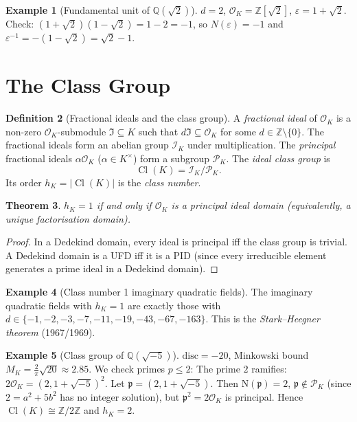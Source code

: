 \documentclass[12pt,a4paper]{amsart}
\newtheorem{theorem}{Theorem}[section]
\theoremstyle{definition}
\newtheorem{definition}[theorem]{Definition}
\newtheorem{example}[theorem]{Example}
\newcommand{\Z}{\mathbb{Z}}
\newcommand{\Q}{\mathbb{Q}}
\newcommand{\OK}{\mathcal{O}_K}
\newcommand{\p}{\mathfrak{p}}
\newcommand{\Nm}{\mathrm{N}}
\newcommand{\disc}{\mathrm{disc}}
\DeclareMathOperator{\Cl}{Cl}
\begin{document}
\begin{example}[Fundamental unit of $\Q(\sqrt{2})$]
$d=2$, $\OK = \Z[\sqrt{2}]$, $\varepsilon = 1 + \sqrt{2}$.
Check: $(1+\sqrt{2})(1-\sqrt{2}) = 1 - 2 = -1$, so $N(\varepsilon) = -1$
and $\varepsilon^{-1} = -(1-\sqrt{2}) = \sqrt{2}-1$.
\end{example}

\section{The Class Group}

\begin{definition}[Fractional ideals and the class group]
A \emph{fractional ideal} of $\OK$ is a non-zero $\OK$-submodule
$\mathfrak{I} \subseteq K$ such that $d\mathfrak{I} \subseteq \OK$
for some $d \in \Z \setminus \{0\}$.  The fractional ideals form an
abelian group $\mathcal{I}_K$ under multiplication.  The \emph{principal}
fractional ideals $\alpha\OK$ ($\alpha \in K^\times$) form a subgroup
$\mathcal{P}_K$.  The \emph{ideal class group} is
\[
  \Cl(K) = \mathcal{I}_K / \mathcal{P}_K.
\]
Its order $h_K = |\Cl(K)|$ is the \emph{class number}.
\end{definition}

\begin{theorem}
$h_K = 1$ if and only if $\OK$ is a principal ideal domain (equivalently,
a unique factorisation domain).
\end{theorem}

\begin{proof}
In a Dedekind domain, every ideal is principal iff the class group is trivial.
A Dedekind domain is a UFD iff it is a PID (since every irreducible element
generates a prime ideal in a Dedekind domain).
\end{proof}

\begin{example}[Class number 1 imaginary quadratic fields]
The imaginary quadratic fields with $h_K = 1$ are exactly those with
$d \in \{-1, -2, -3, -7, -11, -19, -43, -67, -163\}$.
This is the \emph{Stark--Heegner theorem} (1967/1969).
\end{example}

\begin{example}[Class group of $\Q(\sqrt{-5})$]
$\disc = -20$, Minkowski bound $M_K = \frac{2}{\pi}\sqrt{20} \approx 2.85$.
We check primes $p \le 2$: The prime $2$ ramifies: $2\OK = (2, 1+\sqrt{-5})^2$.
Let $\p = (2, 1+\sqrt{-5})$.  Then $\Nm(\p) = 2$, $\p \notin \mathcal{P}_K$
(since $2 = a^2 + 5b^2$ has no integer solution), but $\p^2 = 2\OK$ is principal.
Hence $\Cl(K) \cong \Z/2\Z$ and $h_K = 2$.
\end{example}
\end{document}
